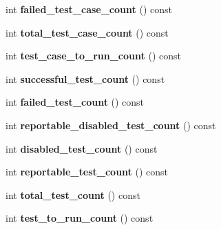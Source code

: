 \begin{DoxyCompactItemize}
\item 
int {\bfseries failed\+\_\+test\+\_\+case\+\_\+count} () const \hypertarget{classtesting_1_1UnitTest_a1084a93a4b92c6506738e309b0a9eeea}{}\label{classtesting_1_1UnitTest_a1084a93a4b92c6506738e309b0a9eeea}

\item 
int {\bfseries total\+\_\+test\+\_\+case\+\_\+count} () const \hypertarget{classtesting_1_1UnitTest_a6802793a0be9cee17380fdd8c7161fcd}{}\label{classtesting_1_1UnitTest_a6802793a0be9cee17380fdd8c7161fcd}

\item 
int {\bfseries test\+\_\+case\+\_\+to\+\_\+run\+\_\+count} () const \hypertarget{classtesting_1_1UnitTest_abb7330165eb5be7beac3f7e6ced5fcdd}{}\label{classtesting_1_1UnitTest_abb7330165eb5be7beac3f7e6ced5fcdd}

\item 
int {\bfseries successful\+\_\+test\+\_\+count} () const \hypertarget{classtesting_1_1UnitTest_a4795d58351f03498d5823a743b0722c5}{}\label{classtesting_1_1UnitTest_a4795d58351f03498d5823a743b0722c5}

\item 
int {\bfseries failed\+\_\+test\+\_\+count} () const \hypertarget{classtesting_1_1UnitTest_aeda0f8ca87adf65f634c3d6d9ab98598}{}\label{classtesting_1_1UnitTest_aeda0f8ca87adf65f634c3d6d9ab98598}

\item 
int {\bfseries reportable\+\_\+disabled\+\_\+test\+\_\+count} () const \hypertarget{classtesting_1_1UnitTest_aa5eaf98c5d9cc0afe501ac03e6414188}{}\label{classtesting_1_1UnitTest_aa5eaf98c5d9cc0afe501ac03e6414188}

\item 
int {\bfseries disabled\+\_\+test\+\_\+count} () const \hypertarget{classtesting_1_1UnitTest_a4cbd084447b74784d1bb85c1ed4b96d5}{}\label{classtesting_1_1UnitTest_a4cbd084447b74784d1bb85c1ed4b96d5}

\item 
int {\bfseries reportable\+\_\+test\+\_\+count} () const \hypertarget{classtesting_1_1UnitTest_aa32cb4f3cd34564a5c641bd409f8f83b}{}\label{classtesting_1_1UnitTest_aa32cb4f3cd34564a5c641bd409f8f83b}

\item 
int {\bfseries total\+\_\+test\+\_\+count} () const \hypertarget{classtesting_1_1UnitTest_a54315b233d354693b9aa1184cf2996de}{}\label{classtesting_1_1UnitTest_a54315b233d354693b9aa1184cf2996de}

\item 
int {\bfseries test\+\_\+to\+\_\+run\+\_\+count} () const \hypertarget{classtesting_1_1UnitTest_a953a52f89898a04ee4a4e08469407cd3}{}\label{classtesting_1_1UnitTest_a953a52f89898a04ee4a4e08469407cd3}


\end{DoxyCompactItemize}
